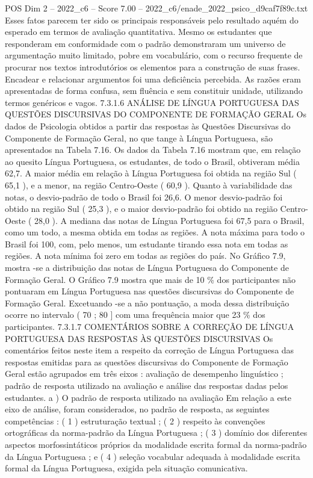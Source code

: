 \begin{textsample}{POS Dim 2 – 2022\_c6 – Score 7.00 – 2022\_c6/enade\_2022\_psico\_d9caf7f89c.txt}
Esses fatos parecem ter sido os principais responsáveis pelo resultado aquém do esperado em termos de avaliação quantitativa.
Mesmo os estudantes que responderam em conformidade com o padrão demonstraram um universo de argumentação muito limitado, pobre em vocabulário, com o recurso frequente de procurar nos textos introdutórios os elementos para a construção de suas frases.
Encadear e relacionar argumentos foi uma deficiência percebida.
As razões eram apresentadas de forma confusa, sem fluência e sem constituir unidade, utilizando termos genéricos e vagos. 7.3.1.6 ANÁLISE DE LÍNGUA PORTUGUESA DAS QUESTÕES DISCURSIVAS DO COMPONENTE DE FORMAÇÃO GERAL Os dados de Psicologia obtidos a partir das respostas às Questões Discursivas do Componente de Formação Geral, no que tange à Língua Portuguesa, são apresentados na Tabela 7.16.
Os dados da Tabela 7.16 mostram que, em relação ao quesito Língua Portuguesa, os estudantes, de todo o Brasil, obtiveram média 62,7.
A maior média em relação à Língua Portuguesa foi obtida na região Sul ( 65,1 ), e a menor, na região Centro-Oeste ( 60,9 ).
Quanto à variabilidade das notas, o desvio-padrão de todo o Brasil foi 26,6.
O menor desvio-padrão foi obtido na região Sul ( 25,3 ), e o maior desvio-padrão foi obtido na região Centro-Oeste ( 28,0 ).
A mediana das notas de Língua Portuguesa foi 67,5 para o Brasil, como um todo, a mesma obtida em todas as regiões.
A nota máxima para todo o Brasil foi 100, com, pelo menos, um estudante tirando essa nota em todas as regiões.
A nota mínima foi zero em todas as regiões do país.
No Gráfico 7.9, mostra -se a distribuição das notas de Língua Portuguesa do Componente de Formação Geral.
O Gráfico 7.9 mostra que mais de 10 \% dos participantes não pontuaram em Língua Portuguesa nas questões discursivas do Componente de Formação Geral.
Excetuando -se a não pontuação, a moda dessa distribuição ocorre no intervalo ( 70 ; 80 ] com uma frequência maior que 23 \% dos participantes. 7.3.1.7 COMENTÁRIOS SOBRE A CORREÇÃO DE LÍNGUA PORTUGUESA DAS RESPOSTAS ÀS QUESTÕES DISCURSIVAS Os comentários feitos neste item a respeito da correção de Língua Portuguesa das respostas emitidas para as questões discursivas do Componente de Formação Geral estão agrupados em três eixos : avaliação de desempenho linguístico ; padrão de resposta utilizado na avaliação e análise das respostas dadas pelos estudantes. a ) O padrão de resposta utilizado na avaliação Em relação a este eixo de análise, foram considerados, no padrão de resposta, as seguintes competências : ( 1 ) estruturação textual ; ( 2 ) respeito às convenções ortográficas da norma-padrão da Língua Portuguesa ; ( 3 ) domínio dos diferentes aspectos morfossintáticos próprios da modalidade escrita formal da norma-padrão da Língua Portuguesa ; e ( 4 ) seleção vocabular adequada à modalidade escrita formal da Língua Portuguesa, exigida pela situação comunicativa.

\end{textsample}
